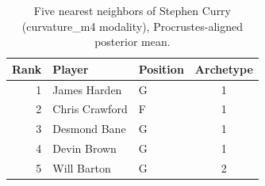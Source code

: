 \begin{table}[htbp]
  \centering\small
  \begin{tabular}{rllc}
    \toprule
    Rank & Player & Position & Archetype \\
    \midrule
    1 & James Harden & G & 1 \\
    2 & Chris Crawford & F & 1 \\
    3 & Desmond Bane & G & 1 \\
    4 & Devin Brown & G & 1 \\
    5 & Will Barton & G & 2 \\
    \bottomrule
  \end{tabular}
  \caption{Five nearest neighbors of Stephen Curry (curvature_m4 modality), Procrustes-aligned posterior mean.}
  \label{tab:Stephen_Curry_neighbors_curvature_m4}
\end{table}

